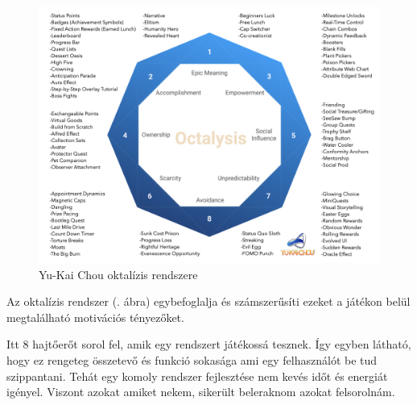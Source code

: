 \begin{figure}[H]
    \centering
    \includegraphics[width=\linewidth]{images/gamification-framework.jpg}
    \caption{Yu-Kai Chou oktalízis rendszere}
    \label{fig:gamification-framework}
\end{figure}

Az oktalízis rendszer (. ábra) egybefoglalja és számszerűsíti ezeket a játékon belül megtalálható motivációs tényezőket. \newline

Itt 8 hajtőerőt sorol fel, amik egy rendszert játékossá tesznek. Így egyben látható, hogy ez rengeteg összetevő és funkció sokasága ami egy felhasználót be tud szippantani. Tehát egy komoly rendszer fejlesztése nem kevés időt és energiát igényel. Viszont azokat amiket nekem, sikerült beleraknom azokat felsorolnám.

